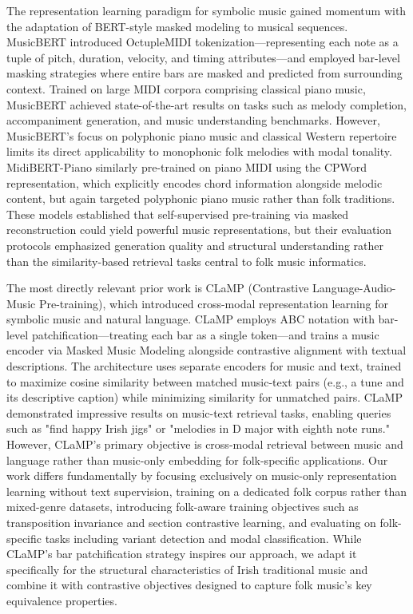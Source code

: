 \documentclass[]{interact}
\theoremstyle{plain}
\theoremstyle{definition}
\theoremstyle{remark}
\begin{document}
The representation learning paradigm for symbolic music gained momentum with the adaptation of BERT-style masked modeling to musical sequences. MusicBERT introduced OctupleMIDI tokenization—representing each note as a tuple of pitch, duration, velocity, and timing attributes—and employed bar-level masking strategies where entire bars are masked and predicted from surrounding context. Trained on large MIDI corpora comprising classical piano music, MusicBERT achieved state-of-the-art results on tasks such as melody completion, accompaniment generation, and music understanding benchmarks. However, MusicBERT's focus on polyphonic piano music and classical Western repertoire limits its direct applicability to monophonic folk melodies with modal tonality. MidiBERT-Piano similarly pre-trained on piano MIDI using the CPWord representation, which explicitly encodes chord information alongside melodic content, but again targeted polyphonic piano music rather than folk traditions. These models established that self-supervised pre-training via masked reconstruction could yield powerful music representations, but their evaluation protocols emphasized generation quality and structural understanding rather than the similarity-based retrieval tasks central to folk music informatics.

The most directly relevant prior work is CLaMP (Contrastive Language-Audio-Music Pre-training), which introduced cross-modal representation learning for symbolic music and natural language. CLaMP employs ABC notation with bar-level patchification—treating each bar as a single token—and trains a music encoder via Masked Music Modeling alongside contrastive alignment with textual descriptions. The architecture uses separate encoders for music and text, trained to maximize cosine similarity between matched music-text pairs (e.g., a tune and its descriptive caption) while minimizing similarity for unmatched pairs. CLaMP demonstrated impressive results on music-text retrieval tasks, enabling queries such as "find happy Irish jigs" or "melodies in D major with eighth note runs." However, CLaMP's primary objective is cross-modal retrieval between music and language rather than music-only embedding for folk-specific applications. Our work differs fundamentally by focusing exclusively on music-only representation learning without text supervision, training on a dedicated folk corpus rather than mixed-genre datasets, introducing folk-aware training objectives such as transposition invariance and section contrastive learning, and evaluating on folk-specific tasks including variant detection and modal classification. While CLaMP's bar patchification strategy inspires our approach, we adapt it specifically for the structural characteristics of Irish traditional music and combine it with contrastive objectives designed to capture folk music's key equivalence properties.
\end{document}
